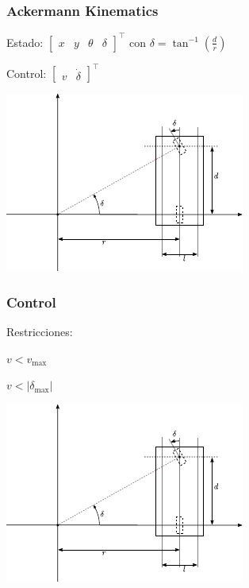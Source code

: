 \begin{frame}
    \frametitle{Ackermann Kinematics}
    
    Estado: $\begin{bmatrix} x & y & \theta & \delta \end{bmatrix}^{\top}$ con $\delta = \tan^{-1}{\left(\frac{d}{r}\right)}$
    
    Control: $\begin{bmatrix} v & \dot{\delta} \end{bmatrix}^{\top}$
    
    
    \begin{center}
        \includegraphics[width=0.6\columnwidth]{images/ackermann_kinematics.pdf}
    \end{center}
    
\end{frame}

\begin{frame}
    \frametitle{Control}
    
    Restricciones:
    
    $v < v_{\max}$
    
    $v < |\delta_{\max}|$
    
    
    \begin{center}
        \includegraphics[width=0.6\columnwidth]{images/ackermann_kinematics.pdf}
    \end{center}
    
\end{frame}

